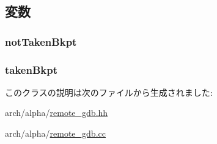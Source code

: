 \subsection{変数}
\hypertarget{classAlphaISA_1_1RemoteGDB_ae1a0a563a724aaffa8ae5b4095957aa4}{
\subsubsection[{notTakenBkpt}]{ {\bf notTakenBkpt}}}
\label{classAlphaISA_1_1RemoteGDB_ae1a0a563a724aaffa8ae5b4095957aa4}
\hypertarget{classAlphaISA_1_1RemoteGDB_abfdbe67e311a613bbbe39b730279f3e1}{
\subsubsection[{takenBkpt}]{ {\bf takenBkpt}}}
\label{classAlphaISA_1_1RemoteGDB_abfdbe67e311a613bbbe39b730279f3e1}


このクラスの説明は次のファイルから生成されました:\begin{DoxyCompactItemize}
\item 
arch/alpha/\hyperlink{arch_2alpha_2remote__gdb_8hh}{remote\_\-gdb.hh}\item 
arch/alpha/\hyperlink{arch_2alpha_2remote__gdb_8cc}{remote\_\-gdb.cc}\end{DoxyCompactItemize}
